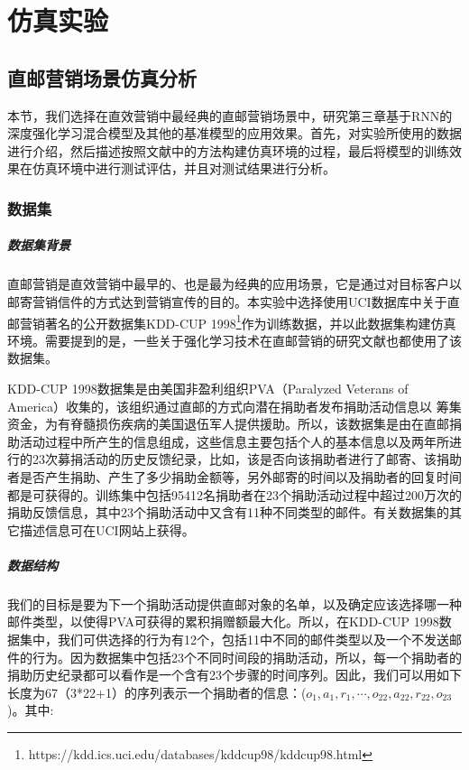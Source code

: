 \chapter{仿真实验}

\section{直邮营销场景仿真分析}
本节，我们选择在直效营销中最经典的直邮营销场景中，研究第三章基于RNN的深度强化学习混合模型及其他的基准模型的应用效果。首先，对实验所使用的数据进行介绍，然后描述按照文献\citep{pednault2002sequential}中的方法构建仿真环境的过程，最后将模型的训练效果在仿真环境中进行测试评估，并且对测试结果进行分析。

\subsection{数据集}

\paragraph{数据集背景}
直邮营销是直效营销中最早的、也是最为经典的应用场景，它是通过对目标客户以邮寄营销信件的方式达到营销宣传的目的。本实验中选择使用UCI数据库中关于直邮营销著名的公开数据集KDD-CUP 1998\footnote{https://kdd.ics.uci.edu/databases/kddcup98/kddcup98.html}作为训练数据，并以此数据集构建仿真环境。需要提到的是，一些关于强化学习技术在直邮营销的研究文献\citep{pednault2002sequential,tkachenko2015autonomous}也都使用了该数据集。

KDD-CUP 1998数据集是由美国非盈利组织PVA（Paralyzed Veterans of America）收集的，该组织通过直邮的方式向潜在捐助者发布捐助活动信息以
筹集资金，为有脊髓损伤疾病的美国退伍军人提供援助。所以，该数据集是由在直邮捐助活动过程中所产生的信息组成，这些信息主要包括个人的基本信息以及两年所进行的23次募捐活动的历史反馈纪录，比如，该是否向该捐助者进行了邮寄、该捐助者是否产生捐助、产生了多少捐助金额等，另外邮寄的时间以及捐助者的回复时间都是可获得的。训练集中包括95412名捐助者在23个捐助活动过程中超过200万次的捐助反馈信息，其中23个捐助活动中又含有11种不同类型的邮件。有关数据集的其它描述信息可在UCI网站上获得。

\paragraph{数据结构}
我们的目标是要为下一个捐助活动提供直邮对象的名单，以及确定应该选择哪一种邮件类型，以使得PVA可获得的累积捐赠额最大化。所以，在KDD-CUP 1998数据集中，我们可供选择的行为有12个，包括11中不同的邮件类型以及一个不发送邮件的行为。因为数据集中包括23个不同时间段的捐助活动，所以，每一个捐助者的捐助历史纪录都可以看作是一个含有23个步骤的时间序列。因此，我们可以用如下长度为67（3*22+1）的序列表示一个捐助者的信息：($o_{1}, a_{1}, r_{1},\cdots,o_{22}, a_{22}, r_{22}, o_{23}$)。其中:

